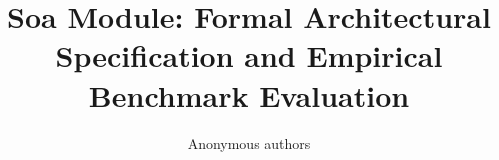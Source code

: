 \title{\textbf{Soa Module: Formal Architectural Specification and Empirical Benchmark Evaluation}}

\author{Anonymous authors}
